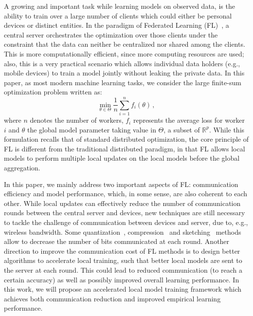 \documentclass[11pt]{article}
\begin{document}
A growing and important task while learning models on observed data, is the ability to train over a large number of clients which could either be personal devices or distinct entities.
In the paradigm of Federated Learning (FL)~\citep{konevcny2016federated,mcmahan2017communication}, a central server orchestrates the optimization over those clients under the constraint that the data can neither be centralized nor shared among the clients.
This is more computationally efficient, since more computing resources are used; also, this is a very practical scenario which allows individual data holders (e.g., mobile devices) to train a model jointly without leaking the private data. In this paper, as most modern machine learning tasks, we consider the large finite-sum optimization problem written as:
\begin{equation}\label{eq:opt}
\min \limits_{\theta \in \Theta} \frac{1}{n} \sum_{i=1}^n f_i(\theta) \, ,
\end{equation}
where $n$ denotes the number of workers, $f_i$ represents the average loss for worker $i$ and $\theta$ the global model parameter taking value in $\Theta$, a subset of $\mathbb{R}^p$.
While this formulation recalls that of standard distributed optimization, the core principle of FL is different from the traditional distributed paradigm, in that FL allows local models to perform multiple local updates on the local models before the global aggregation.

In this paper, we mainly address two important aspects of FL: communication efficiency and model performance, which, in some sense, are also coherent to each other. While local updates can effectively reduce the number of communication rounds between the central server and devices, new techniques are still necessary to tackle the challenge of communication between devices and server, due to, e.g., wireless bandwidth.
Some quantization~\citep{alistarh2017qsgd, wangni2018gradient}, compression~\citep{lin2017deep} and sketching~\citep{Proc:Rothchild_ICML20} methods allow to decrease the number of bits communicated at each round. Another direction to improve the communication cost of FL methods is to design better algorithms to accelerate local training, such that better local models are sent to the server at each round. This could lead to reduced communication (to reach a certain accuracy) as well as possibly improved overall learning performance. In this work, we will propose an accelerated local model training framework which achieves both communication reduction and improved empirical learning performance.
\end{document}
